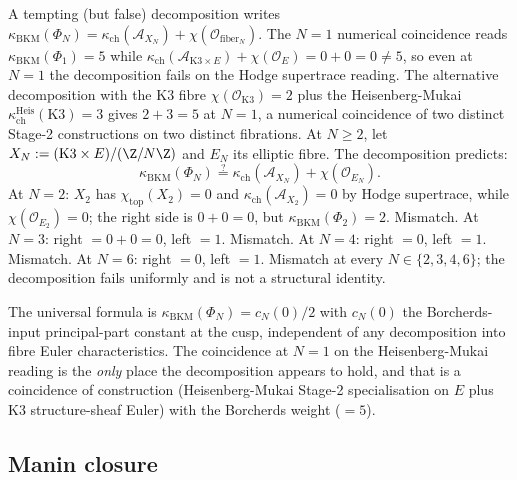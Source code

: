 A tempting (but false) decomposition writes
$\kappa_{\mathrm{BKM}}(\Phi_N) = \kappa_{\mathrm{ch}}(\mathcal{A}_{X_N})
+ \chi(\mathcal{O}_{\mathrm{fiber}_N})$. The $N = 1$ numerical
coincidence reads $\kappa_{\mathrm{BKM}}(\Phi_1) = 5$ while
$\kappa_{\mathrm{ch}}(\mathcal{A}_{\mathrm{K3}\times E}) +
\chi(\mathcal{O}_E) = 0 + 0 = 0 \neq 5$, so even at $N = 1$ the
decomposition fails on the Hodge supertrace reading. The alternative
decomposition with the K3 fibre $\chi(\mathcal{O}_{\mathrm{K3}}) =
2$ plus the Heisenberg-Mukai $\kappa_{\mathrm{ch}}^{\mathrm{Heis}}
(\mathrm{K3}) = 3$ gives $2 + 3 = 5$ at $N = 1$, a numerical
coincidence of two distinct Stage-2 constructions on two distinct
fibrations. At $N \geq 2$, let $X_N := (\mathrm{K3} \times E)/(\Z/
N\Z)$ and $E_N$ its elliptic fibre. The decomposition predicts:
\[
  \kappa_{\mathrm{BKM}}(\Phi_N) \stackrel{?}{=}
  \kappa_{\mathrm{ch}}(\mathcal{A}_{X_N}) +
  \chi(\mathcal{O}_{E_N}).
\]
At $N = 2$: $X_2$ has $\chi_{\mathrm{top}}(X_2) = 0$ and
$\kappa_{\mathrm{ch}}(\mathcal{A}_{X_2}) = 0$ by Hodge supertrace,
while $\chi(\mathcal{O}_{E_2}) = 0$; the right side is $0 + 0 = 0$,
but $\kappa_{\mathrm{BKM}}(\Phi_2) = 2$. Mismatch. At $N = 3$:
right $= 0 + 0 = 0$, left $= 1$. Mismatch. At $N = 4$: right $= 0$,
left $= 1$. Mismatch. At $N = 6$: right $= 0$, left $= 1$. Mismatch
at every $N \in \{2, 3, 4, 6\}$; the decomposition fails uniformly
and is not a structural identity.

The universal formula is $\kappa_{\mathrm{BKM}}(\Phi_N) = c_N(0)/2$
with $c_N(0)$ the Borcherds-input principal-part constant at the
cusp, independent of any decomposition into fibre Euler
characteristics. The coincidence at $N = 1$ on the
Heisenberg-Mukai reading is the \emph{only} place the decomposition
appears to hold, and that is a coincidence of construction
(Heisenberg-Mukai Stage-2 specialisation on $E$ plus K3
structure-sheaf Euler) with the Borcherds weight ($= 5$).

\subsection*{Manin closure}

